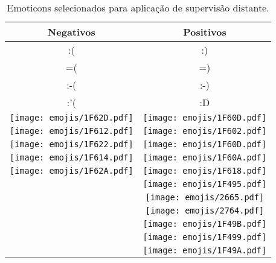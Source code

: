 \begin{table}[h]
    \begin{center}
        \begin{tabular}{| c | c |}
        \hline
        \textbf{Negativos} & \textbf{Positivos} \\ \hline
        :( & :) \\ \hline
        =( & =) \\ \hline
        :-( & :-) \\ \hline
        :'( & :D \\ \hline
        \texttt{[image: emojis/1F62D.pdf]} & \texttt{[image: emojis/1F60D.pdf]} \\ \hline
        \texttt{[image: emojis/1F612.pdf]} & \texttt{[image: emojis/1F602.pdf]} \\ \hline
        \texttt{[image: emojis/1F622.pdf]} & \texttt{[image: emojis/1F60D.pdf]} \\ \hline
        \texttt{[image: emojis/1F614.pdf]} & \texttt{[image: emojis/1F60A.pdf]} \\ \hline
        \texttt{[image: emojis/1F62A.pdf]} & \texttt{[image: emojis/1F618.pdf]} \\ \hline
                                                       & \texttt{[image: emojis/1F495.pdf]} \\ \cline{2-2}
                                                       & \texttt{[image: emojis/2665.pdf]} \\ \cline{2-2}
                                                       & \texttt{[image: emojis/2764.pdf]} \\ \cline{2-2}
                                                       & \texttt{[image: emojis/1F49B.pdf]} \\ \cline{2-2}
                                                       & \texttt{[image: emojis/1F499.pdf]} \\ \cline{2-2}
                                                       & \texttt{[image: emojis/1F49A.pdf]} \\ \hline


        \end{tabular}
        \caption{Emoticons selecionados para aplicação de supervisão distante.}
        \label{tab:emoticons}
    \end{center}
\end{table}

